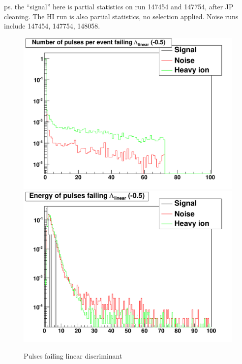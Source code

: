 ps. the ``signal'' here is partial statistics on run 147454 and 147754, after JP cleaning.  The HI run is also partial statistics, no selection applied.  Noise runs include 147454, 147754, 148058.

\begin{figure}
\includegraphics[width=120mm]{DailyLog/6352/6352_Comparison20_Comparison_HFailLambdaLinearCount}
\includegraphics[width=120mm]{DailyLog/6352/6352_Comparison20_Comparison_HFailLambdaLinearEnergy}
\caption{Pulses failing linear discriminant}
\label{Figure_6352_FailLinear_Comparison}
\end{figure}

